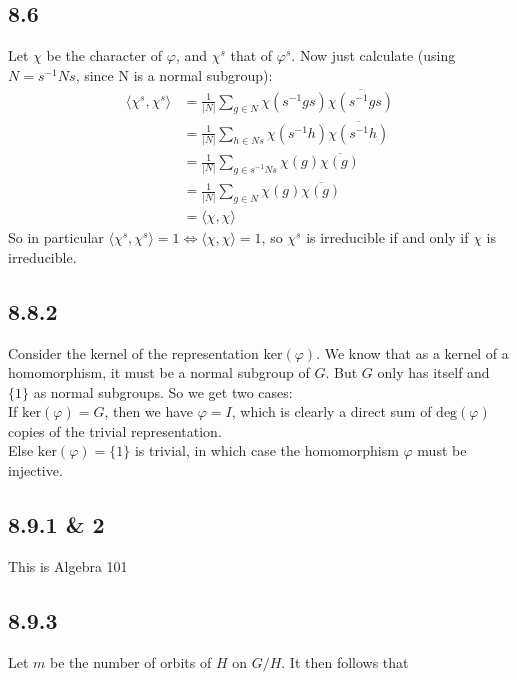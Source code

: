 \documentclass[12pt]{article}
\begin{document}
\subsection*{8.6}

Let $\chi$ be the character of $\varphi$, and $\chi^s$ that of $\varphi^s$. Now just calculate (using $N = s^{-1}Ns$, since N is a normal subgroup):
\begin{align*}
    \langle \chi^s, \chi^s \rangle &= \frac{1}{|N|} \sum_{g \in N} \chi(s^{-1} g s) \overline{\chi(s^{-1} g s)} \\
    &= \frac{1}{|N|} \sum_{h \in Ns} \chi(s^{-1} h) \overline{\chi(s^{-1} h)} \\
    &= \frac{1}{|N|} \sum_{g \in s^{-1}Ns} \chi(g) \overline{\chi(g)} \\
    &= \frac{1}{|N|} \sum_{g \in N} \chi(g) \overline{\chi(g)} \\
    &= \langle \chi, \chi \rangle
\end{align*}
So in particular $\langle \chi^s, \chi^s \rangle = 1 \iff \langle \chi, \chi \rangle = 1$, so $\chi^s$ is irreducible if and only if $\chi$ is irreducible.

\subsection*{8.8.2}

Consider the kernel of the representation $\mathrm{ker}(\varphi)$. We know that as a kernel of a homomorphism, it must be a normal subgroup of $G$. But $G$ only has itself and $\{1\}$ as normal subgroups. So we get two cases: \\
If $\mathrm{ker}(\varphi) = G$, then we have $\varphi = I$, which is clearly a direct sum of $\mathrm{deg}(\varphi)$ copies of the trivial representation. \\
Else $\mathrm{ker}(\varphi) = \{1\}$ is trivial, in which case the homomorphism $\varphi$ must be injective.

\subsection*{8.9.1 \& 2}

This is Algebra 101

\subsection*{8.9.3}

Let $m$ be the number of orbits of $H$ on $G/H$. It then follows that
\end{document}

